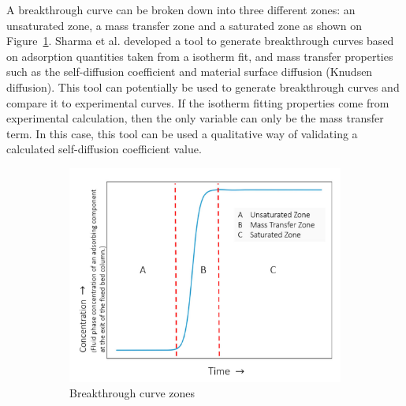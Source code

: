 \documentclass[main]{subfiles}
\begin{document}
A breakthrough curve can be broken down into three different zones: an unsaturated zone, a mass transfer zone and a saturated zone as shown on Figure~\ref{fgr:breakthrough_zones}. Sharma et al. developed a tool to generate breakthrough curves based on adsorption quantities taken from a isotherm fit, and mass transfer properties such as the self-diffusion coefficient and material surface diffusion (Knudsen diffusion).\autocite{Sharma_2023} This tool can potentially be used to generate breakthrough curves and compare it to experimental curves. If the isotherm fitting properties come from experimental calculation, then the only variable can only be the mass transfer term. In this case, this tool can be used a qualitative way of validating a calculated self-diffusion coefficient value.

\begin{figure}[ht]
  \centering
  \begin{subfigure}[b]{0.5\textwidth}
    \centering
    \includegraphics[width=\textwidth]{figures/6-perspectives/breakthrough_cuve_zones.png}
    \caption{Breakthrough curve zones}\label{fgr:breakthrough_zones}
  \end{subfigure}
  \hfill
  \begin{subfigure}[b]{0.4\textwidth}
    \centering

\end{subfigure}
\end{figure}
\end{document}
